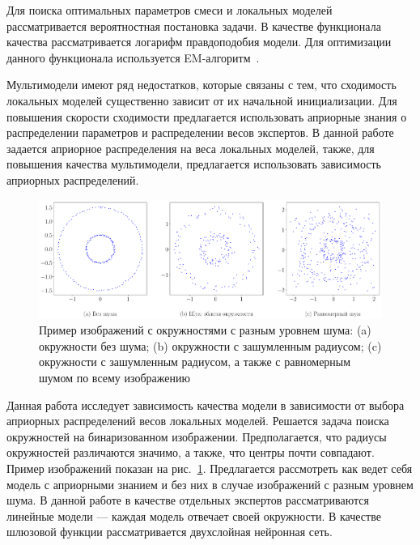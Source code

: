 \documentclass[12pt, twoside]{article}
\numberwithin{equation}{section}
\begin{document}
Для поиска оптимальных параметров смеси и локальных моделей рассматривается вероятностная постановка задачи. В качестве функционала качества рассматривается логарифм правдоподобия модели. Для оптимизации данного функционала используется EM-алгоритм~\cite{Dempster1977}.

Мультимодели имеют ряд недостатков, которые связаны с тем, что сходимость локальных моделей существенно зависит от их начальной инициализации. Для повышения скорости сходимости предлагается использовать априорные знания о распределении параметров и распределении весов экспертов. В данной работе задается априорное распределения на веса локальных моделей, также, для повышения качества мультимодели, предлагается использовать зависимость априорных распределений. 

\begin{figure}[h!t]\center
\includegraphics[width=1\textwidth]{result/statment}
\caption{Пример изображений с окружностями с разным уровнем шума: (a) окружности без шума; (b) окружности с зашумленным радиусом; (c) окружности с зашумленным радиусом, а также с равномерным шумом по всему изображению}
\label{example:1}
\end{figure}

Данная работа исследует зависимость качества модели в зависимости от выбора априорных распределений весов локальных моделей. Решается задача поиска окружностей на бинаризованном изображении. Предполагается, что радиусы окружностей различаются значимо, а также, что центры почти совпадают. Пример изображений показан на рис.~\ref{example:1}. Предлагается рассмотреть как ведет себя модель с априорными знанием и без них в случае изображений с разным уровнем шума. В данной работе в качестве отдельных экспертов рассматриваются линейные модели --- каждая модель отвечает своей окружности. В качестве шлюзовой функции рассматривается двухслойная нейронная сеть.
\end{document}

